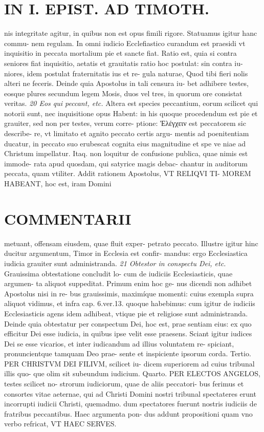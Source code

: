 \documentclass{article}
\begin{document}
\begin{pages}
\section*{IN I. EPIST. AD TIMOTH. }
\marginpar{[ p.135. ]}\pstart nis integritate agitur, in quibus non est opus fimili rigore. Statuamus igitur hanc commu- nem regulam. In omni iudicio Ecclefiastico curandum est praesidi vt inquisitio in peccata mortalium pie et sancte fiat. Ratio est, quia si contra seniores fiat inquisitio, aetatis et grauitatis ratio hoc postulat: sin contra iu- niores, idem postulat fraternitatis ius et re- gula naturae, Quod tibi fieri nolis alteri ne feceris.  \pend\pstart Deinde quia Apostolus in tali censura iu- bet adhibere testes, eosque plures secundum legem Mosis, duos vel tres, in quorum ore consistat veritas.  \pend
\textit{20 Eos qui peccant, etc. }\pstart Altera est species peccantium, eorum scilicet qui notorii sunt, nec inquisitione opus Habent: in his quoque procedendum est pie et grauiter, sed non per testes, verum corre- ptione: Ἐλέγχειν est peccatorem sic describe- re, vt limitato et agnito peccato certis argu- mentis ad poenitentiam ducatur, in peccato suo erubescat cognita eius magnitudine et spe ve niae ad Christum impellatur. Itaq. non loquitur de confusione publica, quae nimis est immode- rata apud quosdam, qui satyrice magis debac- chantur in auditorum peccata, quam vtiliter. Addit rationem Apostolus, VT RELIQVI TI- MOREM HABEANT, hoc est, iram Domini  \pend
\section*{COMMENTARII }
\marginpar{[ p.136 ]}\pstart metuant, offensam eiusdem, quae fluit exper- petrato peccato. Illustre igitur hinc ducitur argumentum, Timor in Ecclesia est confir- mandus: ergo Ecclesiastica iudicia grauiter sunt administranda.  \pend
\textit{21 Obtestor in conspectu Dei, etc. }\pstart Grauissima obtestatione concludit lo- cum de iudiciis Ecclesiasticis, quae argumen- ta aliquot suppeditat. Primum enim hoc ge- nus dicendi non adhibet Apostolus nisi in re- bus grauissimis, maximíque momenti: cuius exempla supra aliquot vidimus, et infra cap. 6.ver.13. quoque habebimus: cum igitur de iudiciis Ecclesiasticis agens idem adhibeat, vtique pie et religiose sunt administranda. Deinde quia obtestatur per conspectum Dei, hoc est, prae sentiam eius: ex quo efficitur Dei esse iudicia, in quibus ipse velit esse praesens.  \pend\pstart Sciant igitur iudices Dei se esse vicarios, et inter iudicandum ad illius voluntatem re- spiciant, pronuncientque tamquam Deo prae- sente et inspiciente ipsorum corda. Tertio. PER CHRISTVM DEI FILIVM, scilicet iu- dicem superiorem ad cuius tribunal illis quo- que olim sit subeundum iudicium. Quarto. PER ELECTOS ANGELOS, testes scilicet no- strorum iudiciorum, quae de aliis peccatori- bus ferimus et consortes vitae aeternae, qui ad Christi Domini nostri tribunal spectateres  \pend\pstart erunt incorrupti iudicii Christi, quemadmo. dum spectatores fuerunt nostris iudiciis de fratribus peccantibus. Haec argumenta pon- dus addunt propositioni quam vno verbo refricat, VT HAEC SERVES.  \pend

\end{pages}
\end{document}
